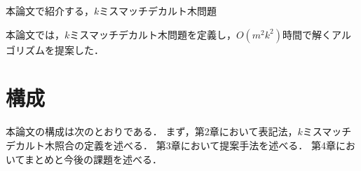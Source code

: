 本論文で紹介する，$k$ミスマッチデカルト木問題


\indent 本論文では，$k$ミスマッチデカルト木問題を定義し，$O(m^2k^2)$時間で解くアルゴリズムを提案した．

\section{構成}
本論文の構成は次のとおりである．
まず，第2章において表記法，$k$ミスマッチデカルト木照合の定義を述べる．
第3章において提案手法を述べる．
第4章においてまとめと今後の課題を述べる．


